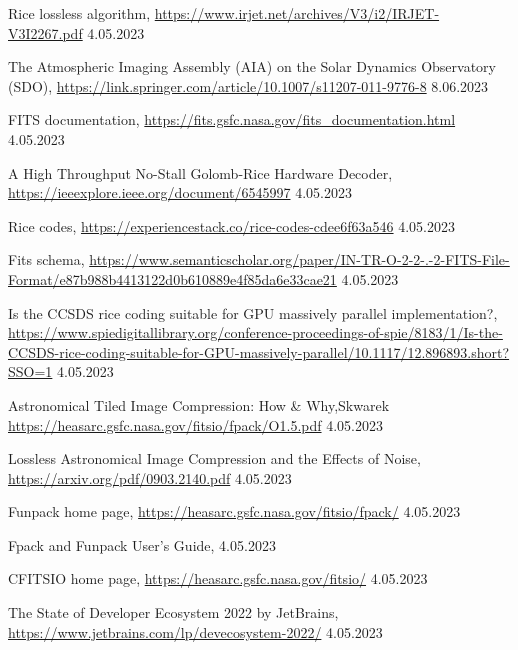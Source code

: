 \documentclass[licencjacka,en]{pracamgr}
\begin{document}
\begin{thebibliography}{99}

         {Rice lossless algorithm},
        \url{https://www.irjet.net/archives/V3/i2/IRJET-V3I2267.pdf} 4.05.2023

         {The Atmospheric Imaging Assembly (AIA) on the Solar Dynamics Observatory (SDO)},
        \url{https://link.springer.com/article/10.1007/s11207-011-9776-8} 8.06.2023


         {FITS documentation},
        \url{https://fits.gsfc.nasa.gov/fits_documentation.html} 4.05.2023

         {A High Throughput No-Stall Golomb-Rice Hardware Decoder},
        \url{https://ieeexplore.ieee.org/document/6545997} 4.05.2023 

         {Rice codes},
        \url{https://experiencestack.co/rice-codes-cdee6f63a546} 4.05.2023

         {Fits schema},
        \url{https://www.semanticscholar.org/paper/IN-TR-O-2-2-.-2-FITS-File-Format/e87b988b4413122d0b610889e4f85da6e33cae21} 4.05.2023
        
         {Is the CCSDS rice coding suitable for GPU massively parallel implementation?},
        \url{https://www.spiedigitallibrary.org/conference-proceedings-of-spie/8183/1/Is-the-CCSDS-rice-coding-suitable-for-GPU-massively-parallel/10.1117/12.896893.short?SSO=1} 4.05.2023 
        
         {Astronomical Tiled Image Compression: How \& Why},Skwarek
        \url{https://heasarc.gsfc.nasa.gov/fitsio/fpack/O1.5.pdf} 4.05.2023 
        
         {Lossless Astronomical Image Compression and the Effects of Noise},
        \url{https://arxiv.org/pdf/0903.2140.pdf} 4.05.2023 

         {Funpack home page},
        \url{https://heasarc.gsfc.nasa.gov/fitsio/fpack/} 4.05.2023 

         {Fpack and Funpack User's Guide},
        \url{} 4.05.2023 

         {CFITSIO home page},
        \url{https://heasarc.gsfc.nasa.gov/fitsio/} 4.05.2023

         {The State of Developer Ecosystem 2022 by JetBrains},
        \url{https://www.jetbrains.com/lp/devecosystem-2022/} 4.05.2023


\end{thebibliography}
\end{document}
